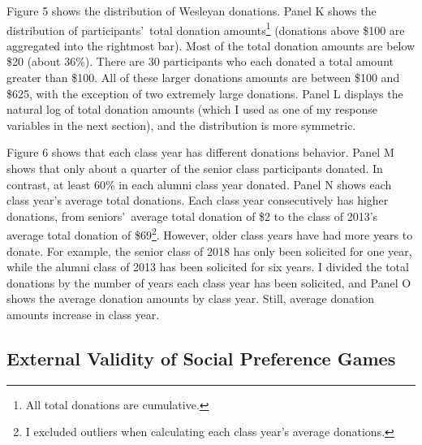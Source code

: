 \documentclass[12pt]{article}
\begin{document}
Figure 5 shows the distribution of Wesleyan donations. Panel K shows the distribution of participants\rq \ total donation amounts\footnote{All total donations are cumulative.} (donations above \$100 are aggregated into the rightmost bar). Most of the total donation amounts are below \$20 (about 36\%). There are 30 participants who each donated a total amount greater than \$100. All of these larger donations amounts are between \$100 and \$625, with the exception of two extremely large donations. Panel L displays the natural log of total donation amounts (which I used as one of my response variables in the next section), and the distribution is more symmetric.

Figure 6 shows that each class year has different donations behavior. Panel M shows that only about a quarter of the senior class participants donated. In contrast, at least 60\% in each alumni class year donated. Panel N shows each class year\rq s average total donations. Each class year consecutively has higher donations, from seniors\rq \ average total donation of \$2 to the class of 2013\rq s average total donation of \$69\footnote{I excluded outliers when calculating each class year\rq s average donations.}. However, older class years have had more years to donate. For example, the senior class of 2018 has only been solicited for one year, while the alumni class of 2013 has been solicited for six years. I divided the total donations by the number of years each class year has been solicited, and Panel O shows the average donation amounts by class year. Still, average donation amounts increase in class year.


\subsection{External Validity of Social Preference Games}
\end{document}
